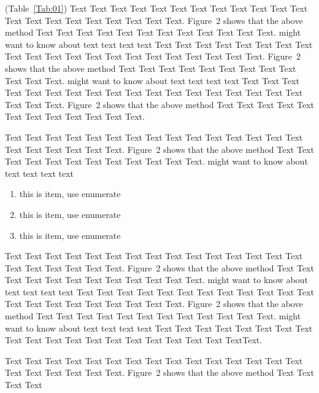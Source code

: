 \documentclass{bioinfo}
\begin{document}
(Table~\ref{Tab:01}) Text Text Text Text Text Text  Text Text Text
Text Text Text Text Text Text  Text Text Text Text Text Text.
Figure~2\vphantom{\ref{fig:02}} shows that the above method  Text
Text Text Text  Text Text Text Text Text Text  Text Text.
\citealp{Boffelli03} might want to know about  text text text text
Text Text Text Text Text Text  Text Text Text Text Text Text Text
Text Text  Text Text Text Text Text Text.
Figure~2\vphantom{\ref{fig:02}} shows that the above method  Text
Text Text Text  Text Text Text Text Text Text  Text Text.
\citealp{Boffelli03} might want to know about  text text text text
Text Text Text Text Text Text Text Text Text Text Text Text Text
Text Text  Text Text Text Text Text Text.
Figure~2\vphantom{\ref{fig:02}} shows that the above method  Text
Text Text Text  Text Text Text Text Text Text  Text Text.



Text Text Text Text Text Text  Text Text Text Text Text Text Text
Text Text  Text Text Text Text Text Text.
Figure~2\vphantom{\ref{fig:02}} shows that the above method  Text
Text Text Text  Text Text Text Text Text Text  Text Text.
\citealp{Boffelli03} might want to know about  text text text text

\begin{enumerate}
\item this is item, use enumerate
\item this is item, use enumerate
\item this is item, use enumerate
\end{enumerate}

Text Text Text Text Text Text Text Text Text Text Text Text Text
Text Text Text Text Text Text Text Text.
Figure~2\vphantom{\ref{fig:02}} shows\vadjust{\pagebreak} that the
above method  Text Text Text Text Text Text Text Text Text Text
Text Text.  \citealp{Boffelli03} might want to know about text
text text text Text Text Text Text Text Text  Text Text Text Text
Text Text Text Text Text Text Text Text Text Text Text.
Figure~2\vphantom{\ref{fig:02}} shows that the above method  Text
Text Text Text Text Text Text Text Text Text  Text Text.
\citealp{Boffelli03} might want to know about text text text text
Text Text Text Text Text Text  Text Text Text Text Text Text Text
Text Text Text Text Text Text Text\break Text.


Text Text Text Text Text Text  Text Text Text Text Text Text Text
Text Text  Text Text Text Text Text Text.
Figure~2\vphantom{\ref{fig:02}} shows that the above method  Text
Text Text Text\vspace*{-10pt}
\end{document}

